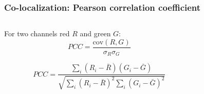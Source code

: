 \documentclass[ignorenonframetext,aspectratio=169,10pt,xcolor=table]{beamer}
\begin{document}
\begin{frame} \frametitle{Co-localization: Pearson correlation coefficient}
  \begin{columns}
    \begin{column}{0.5\textwidth}
      For two channels red $R$ and green $G$:
      \begin{equation*}
        PCC = \frac{\mathrm{cov}(R,G)}{\sigma_R \sigma_G}
      \end{equation*}

      \begin{equation*}
        PCC = 
        \frac{\sum_i (R_i - \bar{R}) (G_i - \bar{G})}
            {\sqrt{\sum_i (R_i - \bar{R})^2 \sum_i (G_i - \bar{G})^2}}
      \end{equation*}
    \end{column}
    \begin{column}{0.5\textwidth}

    \end{column}
  \end{columns}
\end{frame}





\end{document}
